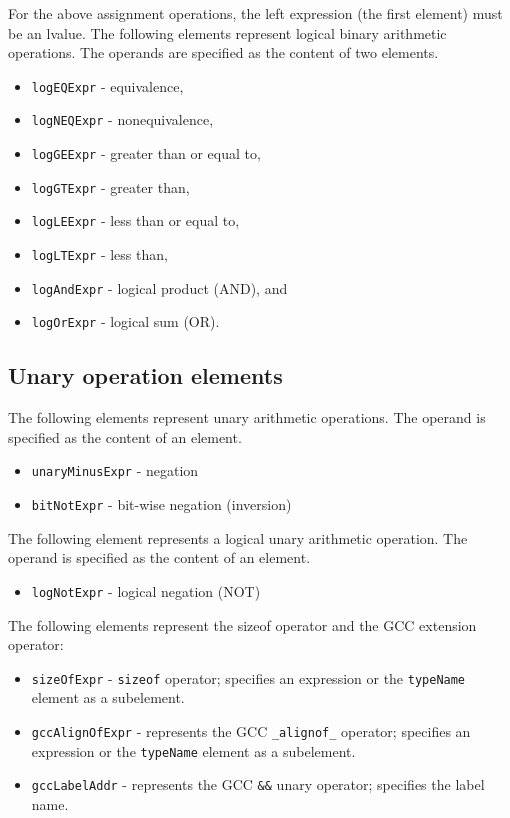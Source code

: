 For the above assignment operations, the left expression (the first element) must be an lvalue.
The following elements represent logical binary arithmetic operations. The operands are specified as the content of two elements.

\begin{itemize}
\item {\tt logEQExpr} - equivalence,
\item {\tt logNEQExpr} - nonequivalence,
\item {\tt logGEExpr} - greater than or equal to,
\item {\tt logGTExpr} - greater than,
\item {\tt logLEExpr} - less than or equal to,
\item {\tt logLTExpr} - less than,
\item {\tt logAndExpr} - logical product (AND), and
\item {\tt logOrExpr} - logical sum (OR).
\end{itemize}


\subsection{Unary operation elements}

The following elements represent unary arithmetic operations. The operand is specified as the content of an element.

\begin{itemize}
\item {\tt unaryMinusExpr} - negation
\item {\tt bitNotExpr} - bit-wise negation (inversion)
\end{itemize}

The following element represents a logical unary arithmetic operation. The operand is specified as the content of an element.

\begin{itemize}
\item {\tt logNotExpr} - logical negation (NOT)
\end{itemize}

The following elements represent the sizeof operator and the GCC extension operator:

\begin{itemize}
\item {\tt sizeOfExpr} - {\tt sizeof} operator; 
specifies an expression or the {\tt typeName} element as a subelement.
\item {\tt gccAlignOfExpr} - represents the GCC {\tt \_alignof\_} operator;
specifies an expression or the {\tt typeName} element as a subelement.
\item {\tt gccLabelAddr} - represents the GCC {\tt \&\&} unary operator;
specifies the label name.
\end{itemize}


